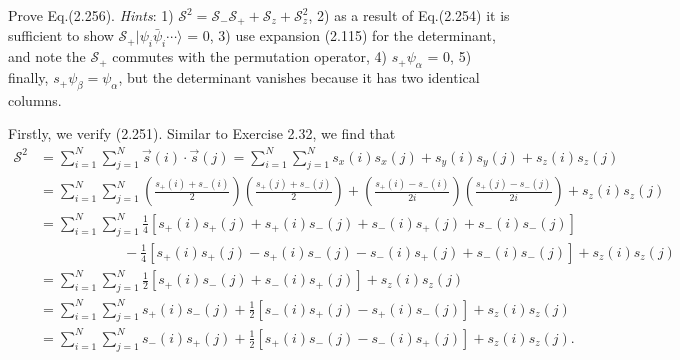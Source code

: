 \documentclass[a4paper]{book}
\newcounter{exercise}[chapter]
\newcounter{solution}[chapter]
\begin{document}
	\begin{exercise}
	Prove Eq.(2.256). {\it Hints}: 1) $\mathscr{S}^2 = \mathscr{S}_- \mathscr{S}_+ + \mathscr{S}_z + \mathscr{S}^2_z$,  2) as a result of Eq.(2.254) it is sufficient to show $\mathscr{S}_+ | \psi_i \bar{\psi}_i \cdots \rangle$ = 0, 3) use expansion (2.115) for the determinant, and note the $\mathscr{S}_+$ commutes with the permutation operator, 4) $s_+ \psi_\alpha $ = 0, 5) finally, $s_+ \psi_\beta = \psi_\alpha $, but the determinant vanishes because it has two identical columns.
	\end{exercise}
	
	\begin{solution}
	
	Firstly, we verify (2.251). Similar to Exercise 2.32, we find that
	\begin{align*}
		\mathscr{S}^2 &= \sum_{ i=1 }^N \sum_{ j=1 }^N \vec{s}(i) \cdot \vec{s}(j) = \sum_{ i=1 }^N \sum_{ j=1 }^N s_x(i) s_x(j) +  s_y(i) s_y(j) + s_z(i) s_z(j) \\
		&= \sum_{ i=1 }^N \sum_{ j=1 }^N \left( \frac{ s_+(i) + s_-(i) }{2} \right) \left( \frac{ s_+(j) + s_-(j) }{2} \right) + \left( \frac{ s_+(i) - s_-(i) }{2i} \right) \left( \frac{ s_+(j) - s_-(j) }{2i} \right) + s_z(i) s_z(j) \\
		&= \sum_{ i=1 }^N \sum_{ j=1 }^N \frac{1}{4} \left[ s_+(i) s_+(j) + s_+(i) s_-(j) + s_-(i) s_+(j) + s_-(i) s_-(j) \right] \\
		&\hspace{6em} - \frac{1}{4} \left[ s_+(i) s_+(j) - s_+(i) s_-(j) - s_-(i) s_+(j) + s_-(i) s_-(j) \right] + s_z(i) s_z(j) \\
		&= \sum_{ i=1 }^N \sum_{ j=1 }^N \frac{1}{2} \left[ s_+(i) s_-(j) + s_-(i) s_+(j) \right] + s_z(i) s_z(j) \\
		&= \sum_{ i=1 }^N \sum_{ j=1 }^N s_+(i) s_-(j) + \frac{1}{2} \left[ s_-(i) s_+(j) - s_+(i) s_-(j) \right] + s_z(i) s_z(j) \\
		&= \sum_{ i=1 }^N \sum_{ j=1 }^N s_-(i) s_+(j) + \frac{1}{2} \left[ s_+(i) s_-(j) - s_-(i) s_+(j) \right] + s_z(i) s_z(j) .
	\end{align*}
	

\end{solution}
\end{document}
